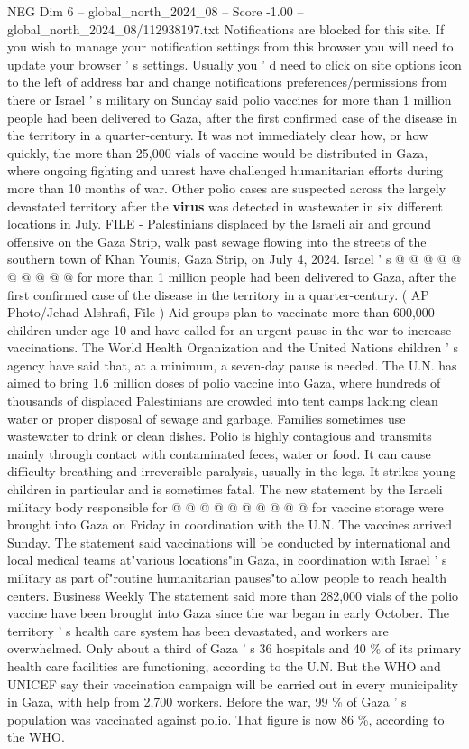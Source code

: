 \begin{textsample}{NEG Dim 6 – global\_north\_2024\_08 – Score -1.00 – global\_north\_2024\_08/112938197.txt}  \label{ex:f6_neg_162}
Notifications are blocked for this site.
If you wish to manage your notification settings from this browser you will need to update your browser ' s settings.
Usually you ' d need to click on site options icon to the left of address bar and change notifications preferences/permissions from there or Israel ' s military on Sunday said polio vaccines for more than 1 million people had been delivered to Gaza, after the first confirmed case of the disease in the territory in a quarter-century.
It was not immediately clear how, or how quickly, the more than 25,000 vials of vaccine would be distributed in Gaza, where ongoing fighting and unrest have challenged humanitarian efforts during more than 10 months of war.
Other polio cases are suspected across the largely devastated territory after the \textbf{virus} was detected in wastewater in six different locations in July.
FILE - Palestinians displaced by the Israeli air and ground offensive on the Gaza Strip, walk past sewage flowing into the streets of the southern town of Khan Younis, Gaza Strip, on July 4, 2024.
Israel ' s @ @ @ @ @ @ @ @ @ @ for more than 1 million people had been delivered to Gaza, after the first confirmed case of the disease in the territory in a quarter-century. ( AP Photo/Jehad Alshrafi, File ) Aid groups plan to vaccinate more than 600,000 children under age 10 and have called for an urgent pause in the war to increase vaccinations.
The World Health Organization and the United Nations children ' s agency have said that, at a minimum, a seven-day pause is needed.
The U.N. has aimed to bring 1.6 million doses of polio vaccine into Gaza, where hundreds of thousands of displaced Palestinians are crowded into tent camps lacking clean water or proper disposal of sewage and garbage.
Families sometimes use wastewater to drink or clean dishes.
Polio is highly contagious and transmits mainly through contact with contaminated feces, water or food.
It can cause difficulty breathing and irreversible paralysis, usually in the legs.
It strikes young children in particular and is sometimes fatal.
The new statement by the Israeli military body responsible for @ @ @ @ @ @ @ @ @ @ for vaccine storage were brought into Gaza on Friday in coordination with the U.N.
The vaccines arrived Sunday.
The statement said vaccinations will be conducted by international and local medical teams at"various locations"in Gaza, in coordination with Israel ' s military as part of"routine humanitarian pauses"to allow people to reach health centers.
Business Weekly The statement said more than 282,000 vials of the polio vaccine have been brought into Gaza since the war began in early October.
The territory ' s health care system has been devastated, and workers are overwhelmed.
Only about a third of Gaza ' s 36 hospitals and 40 \% of its primary health care facilities are functioning, according to the U.N.
But the WHO and UNICEF say their vaccination campaign will be carried out in every municipality in Gaza, with help from 2,700 workers.
Before the war, 99 \% of Gaza ' s population was vaccinated against polio.
That figure is now 86 \%, according to the WHO.

\end{textsample}
